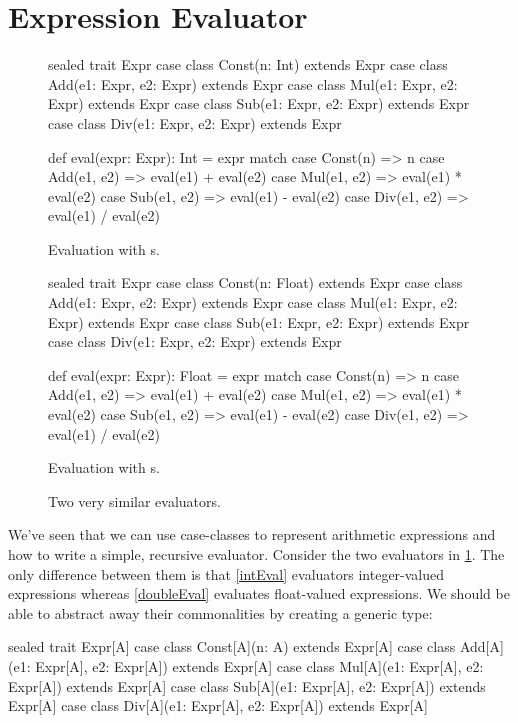 \documentclass{book}
\begin{document}
\section{Expression Evaluator}


\begin{figure}
\begin{minipage}{0.45\textwidth}
\begin{scalacode}
sealed trait Expr
case class Const(n: Int) extends Expr
case class Add(e1: Expr, e2: Expr) extends Expr
case class Mul(e1: Expr, e2: Expr) extends Expr
case class Sub(e1: Expr, e2: Expr) extends Expr
case class Div(e1: Expr, e2: Expr) extends Expr

def eval(expr: Expr): Int = expr match {
  case Const(n) => n
  case Add(e1, e2) => eval(e1) + eval(e2)
  case Mul(e1, e2) => eval(e1) * eval(e2)
  case Sub(e1, e2) => eval(e1) - eval(e2)
  case Div(e1, e2) => eval(e1) / eval(e2)
}
\end{scalacode}
\caption{Evaluation with s.}
\label{intEval}
\end{minipage}
\quad\vrule\quad
\begin{minipage}{0.45\textwidth}
\begin{scalacode}
sealed trait Expr
case class Const(n: Float) extends Expr
case class Add(e1: Expr, e2: Expr) extends Expr
case class Mul(e1: Expr, e2: Expr) extends Expr
case class Sub(e1: Expr, e2: Expr) extends Expr
case class Div(e1: Expr, e2: Expr) extends Expr

def eval(expr: Expr): Float = expr match {
  case Const(n) => n
  case Add(e1, e2) => eval(e1) + eval(e2)
  case Mul(e1, e2) => eval(e1) * eval(e2)
  case Sub(e1, e2) => eval(e1) - eval(e2)
  case Div(e1, e2) => eval(e1) / eval(e2)
}
\end{scalacode}
\caption{Evaluation with s.}
\label{doubleEval}
\end{minipage}
\caption{Two very similar evaluators.}\label{twoevals}
\end{figure}


We've seen that we can use case-classes to represent arithmetic expressions
and how to write a simple, recursive evaluator. Consider the two evaluators
in \cref{twoevals}. The only difference between them is that \cref{intEval}
evaluators integer-valued expressions whereas \cref{doubleEval} evaluates
float-valued expressions. We should be able to abstract away their commonalities
by creating a generic type:

\begin{scalacode}
sealed trait Expr[A]
case class Const[A](n: A) extends Expr[A]
case class Add[A](e1: Expr[A], e2: Expr[A]) extends Expr[A]
case class Mul[A](e1: Expr[A], e2: Expr[A]) extends Expr[A]
case class Sub[A](e1: Expr[A], e2: Expr[A]) extends Expr[A]
case class Div[A](e1: Expr[A], e2: Expr[A]) extends Expr[A]
\end{scalacode}
\end{document}
